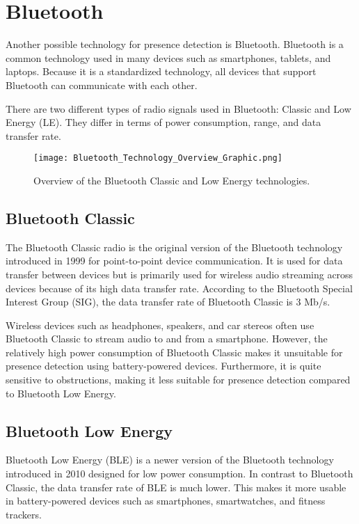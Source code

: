 \section{Bluetooth} \label{sec:bluetooth}

Another possible technology for presence detection is Bluetooth.
Bluetooth is a common technology used in many devices such as smartphones, tablets, and laptops.
Because it is a standardized technology, all devices that support Bluetooth can communicate with each other\cite{BluetoothOverview}.\cite{BluetoothSIG}

There are two different types of radio signals used in Bluetooth: Classic and Low Energy (LE).
They differ in terms of power consumption, range, and data transfer rate.\cite{BluetoothOverview}

\begin{figure}[h!]
  \centering
  \texttt{[image: Bluetooth\_Technology\_Overview\_Graphic.png]}
  \caption{Overview of the Bluetooth Classic and Low Energy technologies\cite{BluetoothOverview}.}
  \label{fig:classic_vs_LE}
\end{figure}

\subsection{Bluetooth Classic} \label{sec:bluetooth_classic}
The Bluetooth Classic radio is the original version of the Bluetooth technology introduced in 1999 for point-to-point device communication.
It is used for data transfer between devices but is primarily used for wireless audio streaming across devices because of its high data transfer rate.
According to the Bluetooth Special Interest Group (SIG), the data transfer rate of Bluetooth Classic is 3 Mb/s.\cite{BluetoothSIG}\cite{BluetoothOverview}

Wireless devices such as headphones, speakers, and car stereos often use Bluetooth Classic to stream audio to and from a smartphone.
However, the relatively high power consumption of Bluetooth Classic makes it unsuitable for presence detection using battery-powered devices.
Furthermore, it is quite sensitive to obstructions, making it less suitable for presence detection compared to Bluetooth Low Energy.\cite{BluetoothOverview}\cite{BluetoothAudioStreaming}

\subsection{Bluetooth Low Energy} \label{sec:bluetooth_low_energy}
Bluetooth Low Energy (BLE) is a newer version of the Bluetooth technology introduced in 2010 designed for low power consumption.
In contrast to Bluetooth Classic, the data transfer rate of BLE is much lower.
This makes it more usable in battery-powered devices such as smartphones, smartwatches, and fitness trackers.\cite{BLE_Regulatory_Aspects_Document}


